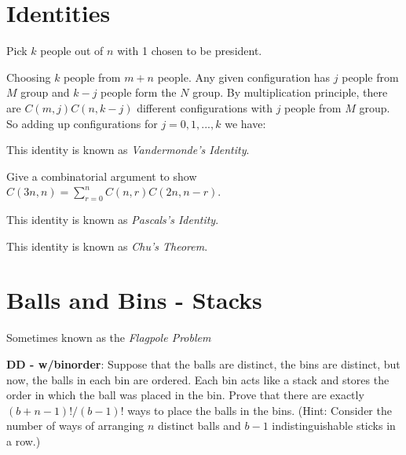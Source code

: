 \frmrule 



\section{Identities}


Pick $k$ people out of $n$ with 1 chosen to be president. 

\frmrule 

Choosing $k$ people from $m+n$ people. 
Any given configuration has $j$ people from $M$ group 
and $k-j$ people form the $N$ group. By multiplication 
principle, there are $C(m,j)C(n,k-j)$ different configurations 
with $j$ people from $M$ group. So adding up configurations 
for $j = 0, 1, ..., k$ we have:

This identity is known as \textit{Vandermonde's Identity}.

\begin{example}
Give a combinatorial argument to show $C(3n,n) = \sum^{n}_{r=0}C(n,r)C(2n,n-r)$.
\end{example}


\frmrule

This identity is known as \textit{Pascals's Identity}.

\frmrule

This identity is known as \textit{Chu's Theorem}.


\frmrule

\section{Balls and Bins - Stacks}

Sometimes known as the \textit{Flagpole Problem}

\begin{example}
\textbf{DD - w/binorder}:
Suppose that the balls are distinct, the bins are distinct, 
but now, the balls in each bin are ordered. Each bin 
acts like a stack and stores the order in which the ball was placed in the bin. 
Prove that there are exactly $(b+n-1)!/(b-1)!$ ways to place the balls in the
bins. (Hint: Consider the number of ways of arranging $n$ distinct balls and $b-1$
indistinguishable sticks in a row.)
\end{example}


